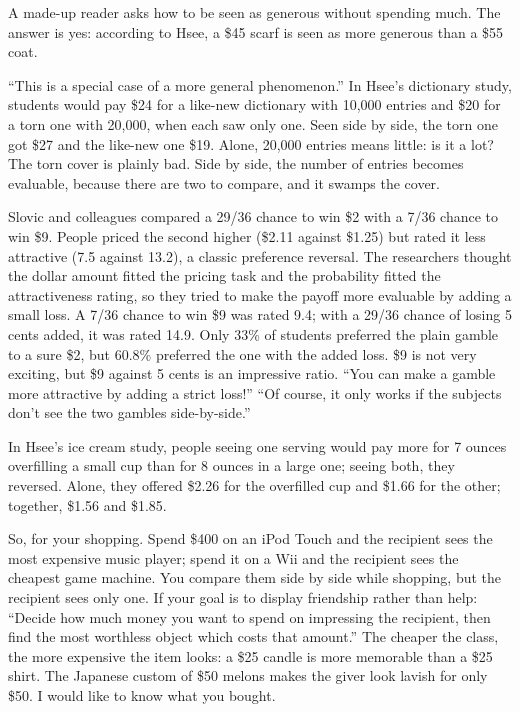 
A made-up reader asks how to be seen as generous without spending much. The answer is yes: according to Hsee, a \$45 scarf is seen as more generous than a \$55 coat. 

``This is a special case of a more general phenomenon.''  In Hsee's dictionary study, students would pay \$24 for a like-new dictionary with 10,000 entries and \$20 for a torn one with 20,000, when each saw only one. Seen side by side, the torn one got \$27 and the like-new one \$19. Alone, 20,000 entries means little: is it a lot? The torn cover is plainly bad. Side by side, the number of entries becomes evaluable, because there are two to compare, and it swamps the cover.

Slovic and colleagues compared a 29/36 chance to win \$2 with a 7/36 chance to win \$9. People priced the second higher (\$2.11 against \$1.25) but rated it less attractive (7.5 against 13.2), a classic preference reversal. The researchers thought the dollar amount fitted the pricing task and the probability fitted the attractiveness rating, so they tried to make the payoff more evaluable by adding a small loss. A 7/36 chance to win \$9 was rated 9.4; with a 29/36 chance of losing 5 cents added, it was rated 14.9. Only 33\% of students preferred the plain gamble to a sure \$2, but 60.8\% preferred the one with the added loss. \$9 is not very exciting, but \$9 against 5 cents is an impressive ratio. ``You can make a gamble more attractive by adding a strict loss!'' ``Of course, it only works if the subjects don't see the two gambles side-by-side.'' 

In Hsee's ice cream study, people seeing one serving would pay more for 7 ounces overfilling a small cup than for 8 ounces in a large one; seeing both, they reversed. Alone, they offered \$2.26 for the overfilled cup and \$1.66 for the other; together, \$1.56 and \$1.85. 

So, for your shopping. Spend \$400 on an iPod Touch and the recipient sees the most expensive music player; spend it on a Wii and the recipient sees the cheapest game machine. You compare them side by side while shopping, but the recipient sees only one. If your goal is to display friendship rather than help: ``Decide how much money you want to spend on impressing the recipient, then find the most worthless object which costs that amount.'' The cheaper the class, the more expensive the item looks: a \$25 candle is more memorable than a \$25 shirt. The Japanese custom of \$50 melons makes the giver look lavish for only \$50. I would like to know what you bought.
